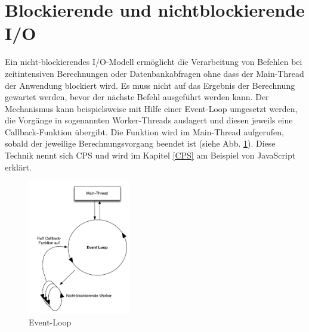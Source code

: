 \section{Blockierende und nichtblockierende \acs{I/O}}
 Ein nicht-blockierendes I/O-Modell ermöglicht die Verarbeitung von Befehlen bei zeitintensiven Berechnungen oder Datenbankabfragen ohne dass der Main-Thread der Anwendung blockiert wird. Es muss nicht auf das Ergebnis der Berechnung gewartet werden, bevor der nächste Befehl ausgeführt werden kann. Der Mechanismus kann beispielsweise mit Hilfe einer Event-Loop umgesetzt werden, die Vorgänge in sogenannten Worker-Threads auslagert und diesen jeweils eine Callback-Funktion übergibt. Die Funktion wird im Main-Thread aufgerufen, sobald der jeweilige Berechnungsvorgang beendet ist (siehe Abb. \ref{img:nonblocking}). Diese Technik nennt sich \acf{CPS} und wird im Kapitel \ref{CPS} am Beispiel von JavaScript erklärt.
\begin{figure}[H]
\centering
\includegraphics[width=0.4\textwidth]{images/nonblocking.png}
\caption[Event-Loop]{Event-Loop}
\label{img:nonblocking}
\end{figure}
\acresetall

